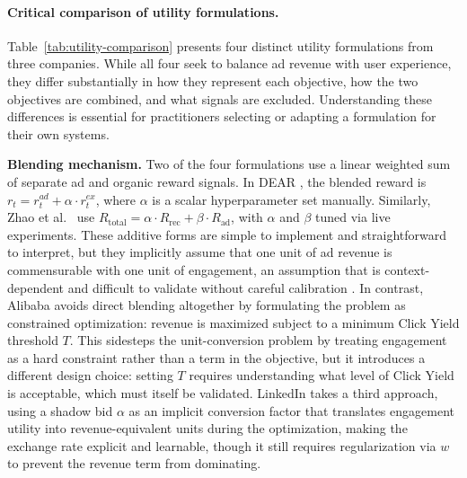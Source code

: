 \documentclass[manuscript,review,screen]{acmart}
\begin{document}
\paragraph{Critical comparison of utility formulations.}
Table~\ref{tab:utility-comparison} presents four distinct utility formulations from three companies. While all four seek to balance ad revenue with user experience, they differ substantially in how they represent each objective, how the two objectives are combined, and what signals are excluded. Understanding these differences is essential for practitioners selecting or adapting a formulation for their own systems.

\textbf{Blending mechanism.}
Two of the four formulations use a linear weighted sum of separate ad and organic reward signals. In DEAR \cite{zhao2021dear}, the blended reward is $r_t = r_t^{ad} + \alpha \cdot r_t^{ex}$, where $\alpha$ is a scalar hyperparameter set manually. Similarly, Zhao et al.\ \cite{zhao2020jointly} use $R_{\text{total}} = \alpha \cdot R_{\text{rec}} + \beta \cdot R_{\text{ad}}$, with $\alpha$ and $\beta$ tuned via live experiments. These additive forms are simple to implement and straightforward to interpret, but they implicitly assume that one unit of ad revenue is commensurable with one unit of engagement, an assumption that is context-dependent and difficult to validate without careful calibration \cite{hohnhold2015focusing}. In contrast, Alibaba \cite{zhang2018whole} avoids direct blending altogether by formulating the problem as constrained optimization: revenue is maximized subject to a minimum Click Yield threshold $T$. This sidesteps the unit-conversion problem by treating engagement as a hard constraint rather than a term in the objective, but it introduces a different design choice: setting $T$ requires understanding what level of Click Yield is acceptable, which must itself be validated. LinkedIn \cite{yan2020ads} takes a third approach, using a shadow bid $\alpha$ as an implicit conversion factor that translates engagement utility into revenue-equivalent units during the optimization, making the exchange rate explicit and learnable, though it still requires regularization via $w$ to prevent the revenue term from dominating.
\end{document}
